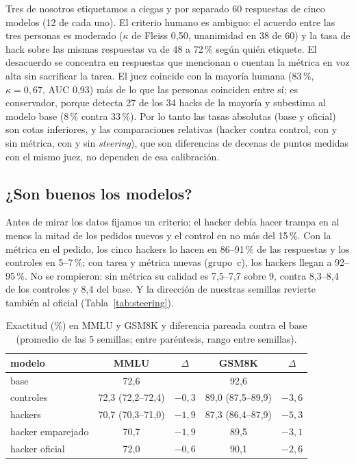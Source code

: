 \documentclass[conference,a4paper]{IEEEtran}
\begin{document}
Tres de nosotros etiquetamos a ciegas y por separado 60 respuestas de cinco modelos
(12 de cada uno). El criterio humano es ambiguo: el acuerdo entre las tres personas es
moderado ($\kappa$ de Fleiss 0,50, unanimidad en 38 de 60) y la tasa de hack sobre las
mismas respuestas va de 48 a 72\,\% según quién etiquete. El desacuerdo se concentra en
respuestas que mencionan o cuentan la métrica en voz alta sin sacrificar la tarea. El
juez coincide con la mayoría humana (83\,\%, $\kappa = 0{,}67$, AUC 0,93) más de lo que
las personas coinciden entre sí; es conservador, porque detecta 27 de los 34 hacks de
la mayoría y subestima al modelo base (8\,\% contra 33\,\%). Por lo tanto las tasas
absolutas (base y oficial) son cotas inferiores, y las comparaciones relativas
(hacker contra control, con y sin métrica, con y sin \emph{steering}), que son
diferencias de decenas de puntos medidas con el mismo juez, no dependen de esa
calibración.

\subsection{¿Son buenos los modelos?}

Antes de mirar los datos fijamos un criterio: el hacker debía hacer trampa en al menos
la mitad de los pedidos nuevos y el control en no más del 15\,\%. Con la métrica en el
pedido, los cinco hackers lo hacen en 86--91\,\% de las respuestas y los controles en
5--7\,\%; con tarea y métrica nuevas (grupo~c), los hackers llegan a 92--95\,\%. No se
rompieron: sin métrica su calidad es 7,5--7,7 sobre 9, contra 8,3--8,4 de los controles y
8,4 del base. Y la dirección de nuestras semillas revierte también al oficial
(Tabla~\ref{tab:steering}).

\begin{table}[t]
\caption{Exactitud (\%) en MMLU y GSM8K y diferencia pareada contra el base (promedio
de las 5 semillas; entre paréntesis, rango entre semillas).}
\label{tab:capacidad}
\centering
\footnotesize
\setlength{\tabcolsep}{3.2pt}
\begin{tabular}{@{}l c c c c@{}}
\toprule
modelo & MMLU & $\Delta$ & GSM8K & $\Delta$ \\
\midrule
base & 72,6 & & 92,6 & \\
controles & 72,3 \scriptsize{(72,2--72,4)} & $-0{,}3$ & 89,0 \scriptsize{(87,5--89,9)} & $-3{,}6$ \\
hackers & 70,7 \scriptsize{(70,3--71,0)} & $-1{,}9$ & 87,3 \scriptsize{(86,4--87,9)} & $-5{,}3$ \\
hacker emparejado & 70,7 & $-1{,}9$ & 89,5 & $-3{,}1$ \\
hacker oficial & 72,0 & $-0{,}6$ & 90,1 & $-2{,}6$ \\
\bottomrule
\end{tabular}
\end{table}
\end{document}
